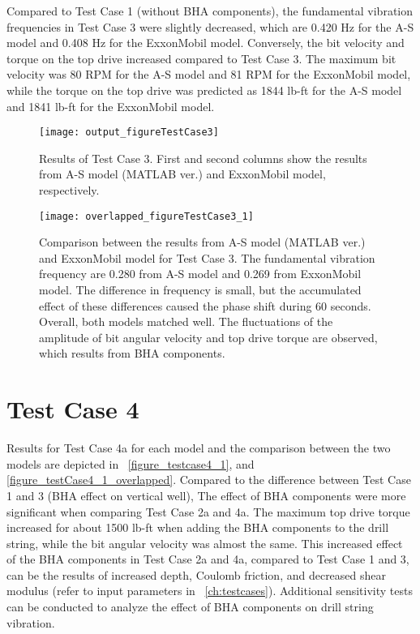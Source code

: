 Compared to Test Case 1 (without BHA components), the fundamental vibration frequencies in Test Case 3 were slightly decreased, which are 0.420 Hz for the A-S model and 0.408 Hz for the ExxonMobil model. Conversely, the bit velocity and torque on the top drive increased compared to Test Case 3. The maximum bit velocity was 80 RPM for the A-S model and 81 RPM for the ExxonMobil model, while the torque on the top drive was predicted as 1844 lb-ft for the A-S model and 1841 lb-ft for the ExxonMobil model. 

\begin{figure}
  \centering
  \texttt{[image: output\_figureTestCase3]}
  \caption[Results of Test Case 3]{Results of Test Case 3. First and second columns show the results from A-S model (MATLAB ver.) and ExxonMobil model, respectively.}\label{figure_testcase3}
\end{figure}
\begin{figure}
  \centering
  \texttt{[image: overlapped\_figureTestCase3\_1]}
  \caption[Comparison of the results for Test Case 3]{Comparison between the results from A-S model (MATLAB ver.) and ExxonMobil model for Test Case 3. The fundamental vibration frequency are 0.280 from A-S model and 0.269 from ExxonMobil model. The difference in frequency is small, but the accumulated effect of these differences caused the phase shift during 60 seconds. Overall, both models matched well. The fluctuations of the amplitude of bit angular velocity and top drive torque are observed, which results from BHA components.}\label{figure_testcase3_overlapped}
\end{figure}

\section{Test Case 4}
Results for Test Case 4a for each model and the comparison between the two models are depicted in \figurename~\ref{figure_testcase4_1}, and \ref{figure_testCase4_1_overlapped}. Compared to the difference between Test Case 1 and 3 (BHA effect on vertical well), The effect of BHA components were more significant when comparing Test Case 2a and 4a. The maximum top drive torque increased for about 1500 lb-ft when adding the BHA components to the drill string, while the bit angular velocity was almost the same. This increased effect of the BHA components in Test Case 2a and 4a, compared to Test Case 1 and 3, can be the results of increased depth, Coulomb friction, and decreased shear modulus (refer to input parameters in \chaptername~\ref{ch:testcases}). Additional sensitivity tests can be conducted to analyze the effect of BHA components on drill string vibration.

